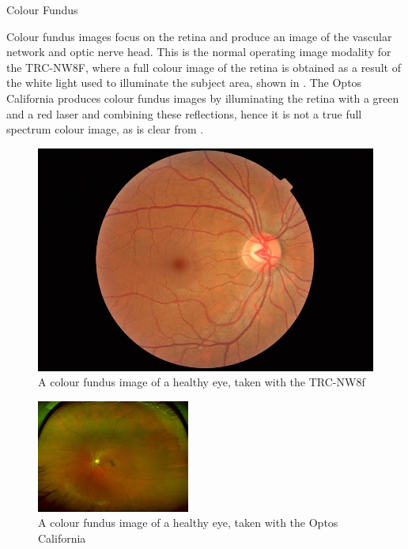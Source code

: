 Colour Fundus 

Colour fundus images focus on the retina and produce an image of the vascular network and optic nerve head. This is the normal operating image modality for the TRC-NW8F, where a full colour image of the retina is obtained as a result of the white light used to illuminate the subject area, shown in . The Optos California produces colour fundus images by illuminating the retina with a green and a red laser and combining these reflections, hence it is not a true full spectrum colour image, as is clear from .

\begin{figure}[htbp]
\centering
  \includegraphics{figures/colourtrc}
\caption{A colour fundus image of a healthy eye, taken with the TRC-NW8f }
\label{fig:cf}
     \end{figure}

\begin{figure}[htbp]
\centering
  \includegraphics{figures/optoscolour}
\caption{A colour fundus image of a healthy eye, taken with the Optos California }
\label{fig:cfoptos}
     \end{figure}


